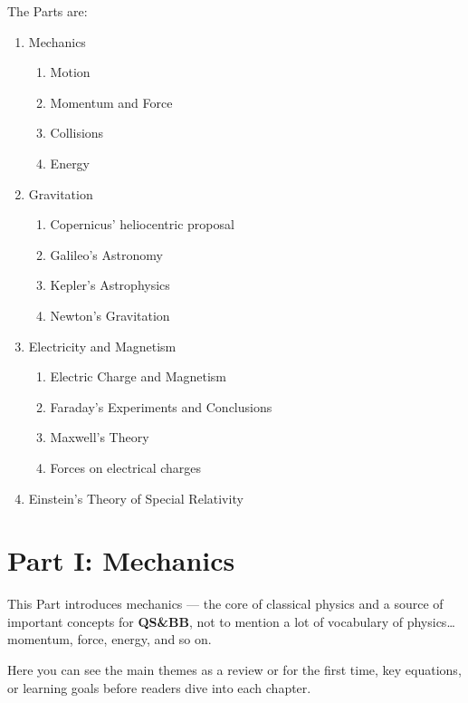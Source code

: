 \documentclass[
  letterpaper,
  DIV=11,
  numbers=noendperiod,
  oneside]{scrreprt}
\providecommand{\tightlist}{%
  \setlength{\itemsep}{0pt}\setlength{\parskip}{0pt}}\usepackage{longtable,booktabs,array}
\begin{document}
The Parts are:

\begin{enumerate}
\def\labelenumi{\arabic{enumi}.}
\tightlist
\item
  Mechanics

  \begin{enumerate}
  \def\labelenumii{\arabic{enumii}.}
  \tightlist
  \item
    Motion
  \item
    Momentum and Force
  \item
    Collisions
  \item
    Energy
  \end{enumerate}
\item
  Gravitation

  \begin{enumerate}
  \def\labelenumii{\arabic{enumii}.}
  \tightlist
  \item
    Copernicus' heliocentric proposal
  \item
    Galileo's Astronomy
  \item
    Kepler's Astrophysics
  \item
    Newton's Gravitation
  \end{enumerate}
\item
  Electricity and Magnetism

  \begin{enumerate}
  \def\labelenumii{\arabic{enumii}.}
  \tightlist
  \item
    Electric Charge and Magnetism
  \item
    Faraday's Experiments and Conclusions
  \item
    Maxwell's Theory
  \item
    Forces on electrical charges
  \end{enumerate}
\item
  Einstein's Theory of Special Relativity
\end{enumerate}

\part{Part I: Mechanics}

This Part introduces mechanics --- the core of classical physics and a
source of important concepts for \textbf{QS\&BB}, not to mention a lot
of vocabulary of physics\ldots momentum, force, energy, and so on.

Here you can see the main themes as a review or for the first time, key
equations, or learning goals before readers dive into each chapter.
\end{document}

